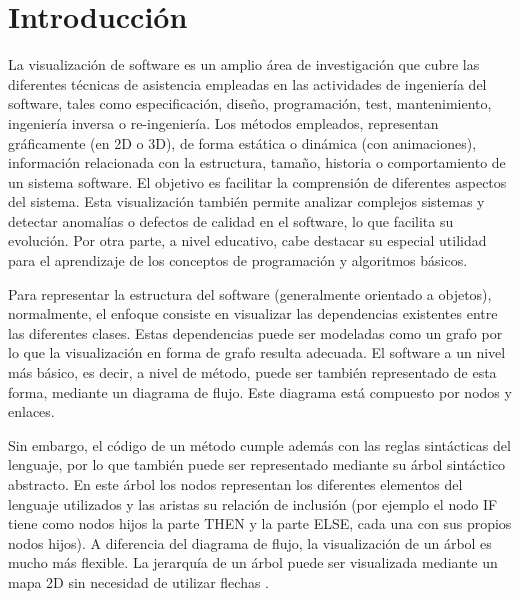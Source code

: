 \documentclass{llncs}
\begin{document}
\section{Introducción}
\label{sec:intro}
La visualización de software es un amplio área de investigación que cubre las diferentes técnicas de asistencia empleadas en las actividades de ingeniería del software, tales como especificación, diseño, programación, test, mantenimiento, ingeniería inversa o re-ingeniería. Los métodos empleados, representan gráficamente (en 2D o 3D), de forma estática o dinámica (con animaciones), información relacionada con la estructura, tamaño, historia o comportamiento de un sistema software. El objetivo es facilitar la comprensión de diferentes aspectos del sistema. Esta visualización también permite analizar complejos sistemas y detectar anomalías o defectos de calidad en el software, lo que facilita su evolución. Por otra parte, a nivel educativo, cabe destacar su especial utilidad para el aprendizaje de los conceptos de programación y algoritmos básicos.

Para representar la estructura del software (generalmente orientado a objetos), normalmente, el enfoque consiste en visualizar las dependencias existentes entre las diferentes clases. Estas dependencias puede ser modeladas como un grafo por lo que la visualización en forma de grafo resulta adecuada. El software a un nivel más básico, es decir, a nivel de método, puede ser también representado de esta forma, mediante un diagrama de flujo. Este diagrama está compuesto por nodos y enlaces.

Sin embargo, el código de un método cumple además con las reglas sintácticas del lenguaje, por lo que también puede ser representado mediante su árbol sintáctico abstracto. En este árbol los nodos representan los diferentes elementos del lenguaje utilizados y las aristas su relación de inclusión (por ejemplo el nodo IF tiene como nodos hijos la parte THEN y la parte ELSE, cada una con sus propios nodos hijos). A diferencia del diagrama de flujo, la visualización de un árbol es mucho más flexible. La jerarquía de un árbol puede ser visualizada mediante un mapa 2D sin necesidad de utilizar flechas \cite{softwarevisualization}.
\end{document}
